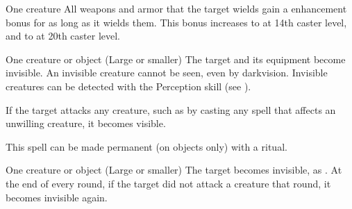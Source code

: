 \begin{spellheader}
    \spellrng{\rngclose}
    \spelldur{\durshort}
\end{spellheader}
\begin{spelleffects}
    \begin{spelltarget}{One creature}
        \spelleffect All weapons and armor that the target wields gain a  enhancement bonus for as long as it wields them. This bonus increases to  at 14th caster level, and to  at 20th caster level.
    \end{spelltarget}
\end{spelleffects}
\begin{spellfooter}
    
\end{spellfooter}

\begin{spellheader}
    \spellrng{\rngclose}
    \spelldur{\durshort \dismissable}
\end{spellheader}
\begin{spelleffects}
    \begin{spelltarget}{One creature or object (Large or smaller)}
        \spelleffect The target and its equipment become invisible. An invisible creature cannot be seen, even by darkvision. Invisible creatures can be detected with the Perception skill (see ).

        If the target attacks any creature, such as by casting any spell that affects an unwilling creature, it becomes visible.
    \end{spelltarget}
\end{spelleffects}
\begin{spellfooter}
    \spellnotes This spell can be made permanent (on objects only) with a  ritual.
\end{spellfooter}

\begin{spellheader}
    \spellrng{\rngclose}
    \spelldur{\durshort \dismissable}
\end{spellheader}
\begin{spelleffects}
    \begin{spelltarget}{One creature or object (Large or smaller)}
        \spelleffect The target becomes invisible, as . At the end of every round, if the target did not attack a creature that round, it becomes invisible again.
    \end{spelltarget}
\end{spelleffects}
\begin{spellfooter}
    
\end{spellfooter}

